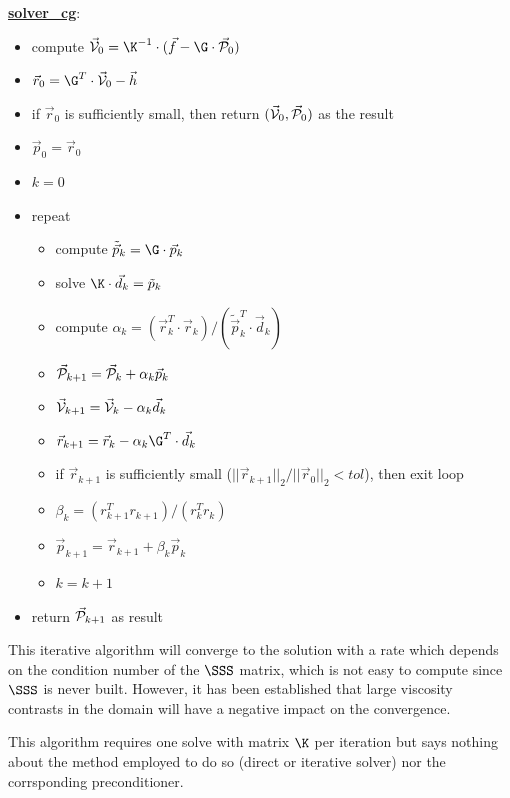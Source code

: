 \begin{mdframed}[backgroundcolor=blue!5]
\underline{\bf solver\_cg}:
\begin{itemize}
\item compute $\vec{\cal V}_0=\K^{-1}\cdot (\vec{f}-\G \cdot \vec{\cal P}_0)$
\item $\vec{r}_0 = \G^T\cdot \vec{\cal V}_0 - \vec{h}$ 
\item if $\vec{r}_0$ is sufficiently small, then return $(\vec{\cal V}_0,\vec{\cal P}_0)$ as the result
\item $\vec{p}_0=\vec{r}_0$
\item $k=0$
\item repeat
\begin{itemize}
\item compute $\tilde{\vec{p}}_k = \G \cdot \vec{p}_k$
\item solve $\K\cdot \vec{d}_k = \tilde{p}_k$
\item compute $\alpha_k=(\vec{r}_k^T \cdot  \vec{r}_k)/(\tilde{\vec{p}}_k^T \cdot \vec{d}_k)$
\item $\vec{\cal P}_{k+1} = \vec{\cal P}_k+\alpha_k \vec{p}_k$
\item $ \vec{\cal V}_{k+1} = \vec{\cal V}_k - \alpha_k \vec{d}_k$
\item $\vec{r}_{k+1} = \vec{r}_k - \alpha_k \G^T \cdot \vec{d}_k $
\item if $\vec{r}_{k+1}$ is sufficiently small ($||\vec{r}_{k+1}||_2/||\vec{r}_0||_2 <tol$), then exit loop
\item $\beta_k=(r_{k+1}^T r_{k+1})/(r_k^T r_k)$
\item $\vec{p}_{k+1} =\vec{r}_{k+1}+ \beta_k \vec{p}_k$
\item $k=k+1$
\end{itemize}
\item return $\vec{\cal P}_{k+1}$ as result
\end{itemize}
\end{mdframed}

This iterative algorithm will converge to the solution with a rate which depends on 
the condition number of the $\SSS$ matrix, which is not easy to compute since 
$\SSS$ is never built. However, it has been established that large viscosity contrasts in the domain 
will have a negative impact on the convergence. 

\begin{remark} 
This algorithm requires one solve with matrix $\K$ per iteration 
but says nothing about the method employed to do so (direct or iterative solver)
nor the corrsponding preconditioner.
\end{remark} 


